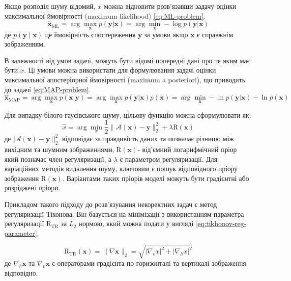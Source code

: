 \documentclass[14pt,a4paper]{extarticle}
\newcounter{e}
\numberwithin{equation}{section}
\numberwithin{figure}{section}
\begin{document}
	Якщо розподіл шуму відомий, $x$ можна відновити розв'язавши задачу оцінки максимальної ймовірності (maximum likelihood) \ref{eq:ML-problem}.
	\begin{equation}
		\label{eq:ML-problem}
		\hat{\boldsymbol{x}}_{\mathrm{ML}}
		= \arg \max_{\boldsymbol{x}} {p (\boldsymbol{y} | \boldsymbol{x})}
		= \arg \min_{\boldsymbol{x}} -\log p(\boldsymbol{y} | \boldsymbol{x})
	\end{equation}
	де $p(\boldsymbol{y} \mid \boldsymbol{x})$ це ймовірність спостереження $\boldsymbol{y}$ за умови якщо $\boldsymbol{x}$ є справжнім зображенням.
	
	В залежності від умов задачі, можуть бути відомі попередні дані про те яким має бути $x$. Ці умови можна використати для формулювання задачі оцінки максимальної апостеріорної ймовірності (maximum a posteriori), що приводить до задачі \ref{eq:MAP-problem}.
	\begin{equation}
		\label{eq:MAP-problem}
		\hat{\boldsymbol{x}}_{\mathrm{MAP}}
		=
		\arg \max_{\boldsymbol{x}} p(\boldsymbol{x} | \boldsymbol{y}) 
		=
		\arg \max_{\boldsymbol{x}} {p(\boldsymbol{y} | \boldsymbol{x})} p(\boldsymbol{x})
		=
		\arg \min_{\boldsymbol{x}} -\ln p(\boldsymbol{y} | \boldsymbol{x})-\ln p(\boldsymbol{x})
	\end{equation}
	
	Для випадку білого гаусівського шуму, цільову функцію можна сформулювати як:
	\begin{equation}
		\label{eq:MAP-avgn}
		\hat{x}=\arg \min_{x} 	\frac{1}{2}\|\mathcal{A}(\boldsymbol{x})-\boldsymbol{y}\|_{2}^{2}+\lambda \mathrm{R}(\boldsymbol{x})
	\end{equation}
	де  $|\mathcal{A}(\boldsymbol{x})-\boldsymbol{y}\|_{2}^{2}$ відповідає за правдивість даних та позначає різницю між вихідним та шумним зображеннями, $\mathrm{R}(\boldsymbol{x})$- від'ємний логарифмічний пріор який позначає член регуляризації, а $\lambda$ є параметром регуляризації. Для варіаційних методів видалення шуму, ключовим є пошук відповідного пріору зображення $\mathrm{R}(\boldsymbol{x})$. Варіантами таких пріорів моделі можуть бути градієнтні або розріджені пріори.

	Прикладом такого підходу до розв'язування некоректних задач є метод регуляризації Тіхонова. Він базується на мінімізації з використанням параметра регуляризації $\mathrm{R}_{\mathrm{TR}}$ за $L_2$ нормою, який можна подати у вигляді \ref{eq:tikhonov-reg-parameter}.
	
	\begin{equation}
		\label{eq:tikhonov-reg-parameter}
		\mathrm{R}_{\mathrm{TR}}(\boldsymbol{x})
		=
		\|\nabla \boldsymbol{x}\|_{2} 
		=
		\sqrt{\left|\nabla_{v} x\right|^{2}+\left|\nabla_{h} x\right|^{2}}
	\end{equation}
	де $\nabla_{h} \boldsymbol{x}$ та $\nabla_{v} \boldsymbol{x}$ є операторами градієнта по горизонталі та вертикалі зображення відповідно.
	
\end{document}
